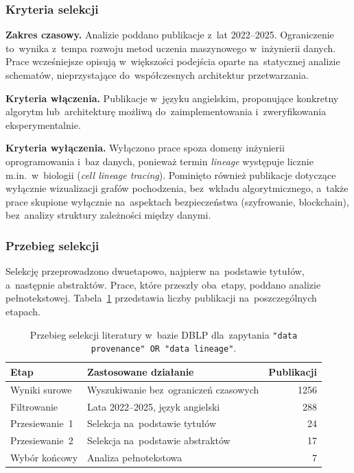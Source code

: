 \documentclass[polish,master,a4paper,oneside]{ppfcmthesis}
\renewcommand{\_}{\origtextunderscore\ifmmode\else\allowbreak\fi}
\begin{document}
\subsubsection{Kryteria selekcji}

\noindent\textbf{Zakres czasowy.} Analizie poddano publikacje z~lat
2022--2025. Ograniczenie to~wynika z~tempa rozwoju metod uczenia maszynowego
w~inżynierii danych. Prace wcześniejsze opisują w~większości podejścia
oparte na~statycznej analizie schematów, nieprzystające do~współczesnych
architektur przetwarzania.

\noindent\textbf{Kryteria włączenia.} Publikacje w~języku angielskim,
proponujące konkretny algorytm lub~architekturę możliwą do~zaimplementowania
i~zweryfikowania eksperymentalnie.

\noindent\textbf{Kryteria wyłączenia.} Wyłączono prace spoza domeny inżynierii
oprogramowania i~baz danych, ponieważ termin \emph{lineage} występuje licznie
m.in.~w~biologii (\emph{cell lineage tracing}). Pominięto również publikacje
dotyczące wyłącznie wizualizacji grafów pochodzenia, bez~wkładu
algorytmicznego, a~także prace skupione wyłącznie na~aspektach
bezpieczeństwa (szyfrowanie, blockchain), bez~analizy struktury zależności
między danymi.

\subsubsection{Przebieg selekcji}

Selekcję przeprowadzono dwuetapowo, najpierw na~podstawie tytułów,
a~następnie abstraktów. Prace, które przeszły oba~etapy, poddano analizie
pełnotekstowej. Tabela~\ref{tab:slr-selekcja} przedstawia liczby
publikacji na~poszczególnych etapach.

\begin{table}[ht]
\centering
\caption[Przebieg selekcji literatury w~bazie DBLP]{Przebieg selekcji literatury w~bazie DBLP dla~zapytania
\texttt{"data provenance" OR "data lineage"}.}
\label{tab:slr-selekcja}
\begin{tabular}{llr}
\toprule
\textbf{Etap} & \textbf{Zastosowane działanie} & \textbf{Publikacji} \\
\midrule
Wyniki surowe   & Wyszukiwanie bez~ograniczeń czasowych      & 1256 \\
Filtrowanie     & Lata 2022--2025, język angielski           &  288 \\
Przesiewanie~1  & Selekcja na~podstawie tytułów              &   24 \\
Przesiewanie~2  & Selekcja na~podstawie abstraktów           &   17 \\
Wybór końcowy   & Analiza pełnotekstowa                      &    7 \\
\bottomrule
\end{tabular}
\end{table}
\end{document}
